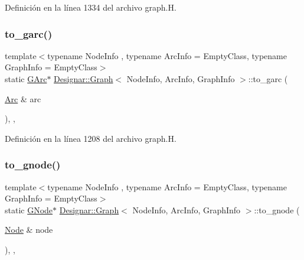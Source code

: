 Definición en la línea 1334 del archivo graph.\+H.

\mbox{\label{class_designar_1_1_graph_ab79eb63dd332e483db77da69c1b04522}} 
\subsubsection{\texorpdfstring{to\+\_\+garc()}{to\_garc()}}
{\footnotesize\ttfamily template$<$typename Node\+Info , typename Arc\+Info  = Empty\+Class, typename Graph\+Info  = Empty\+Class$>$ \\
static \hyperlink{class_designar_1_1_graph_a5ad9e18b71899c2d4979426e367e5573}{G\+Arc}$\ast$ \hyperlink{class_designar_1_1_graph}{Designar\+::\+Graph}$<$ Node\+Info, Arc\+Info, Graph\+Info $>$\+::to\+\_\+garc (\begin{DoxyParamCaption}\item[{\hyperlink{class_designar_1_1_graph_a74c730ef4ce2d20f998d72bd25c2b5bf}{Arc} \&}]{arc }\end{DoxyParamCaption})\hspace{0.3cm}{\ttfamily [inline]}, {\ttfamily [static]}, {\ttfamily [protected]}}



Definición en la línea 1208 del archivo graph.\+H.

\mbox{\label{class_designar_1_1_graph_a23038b7502c6fdb53b23453b19579c0e}} 
\subsubsection{\texorpdfstring{to\+\_\+gnode()}{to\_gnode()}}
{\footnotesize\ttfamily template$<$typename Node\+Info , typename Arc\+Info  = Empty\+Class, typename Graph\+Info  = Empty\+Class$>$ \\
static \hyperlink{class_designar_1_1_graph_a7e61951db0bb9bfa8a2e317440d4e17f}{G\+Node}$\ast$ \hyperlink{class_designar_1_1_graph}{Designar\+::\+Graph}$<$ Node\+Info, Arc\+Info, Graph\+Info $>$\+::to\+\_\+gnode (\begin{DoxyParamCaption}\item[{\hyperlink{class_designar_1_1_graph_a5dfc7dba9d092ac489c72e40390c37d0}{Node} \&}]{node }\end{DoxyParamCaption})\hspace{0.3cm}{\ttfamily [inline]}, {\ttfamily [static]}, {\ttfamily [protected]}}



